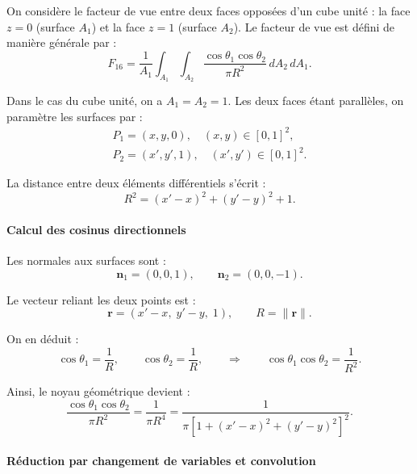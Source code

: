 On considère le facteur de vue entre deux faces opposées d'un cube unité : la face $z=0$ (surface $A_1$) et la face $z=1$ (surface $A_2$). Le facteur de vue est défini de manière générale par :
\begin{equation}
F_{16}=\frac{1}{A_1}\int_{A_1}\int_{A_2}\frac{\cos\theta_1 \cos\theta_2}{\pi R^2}\, dA_2\, dA_1.
\end{equation}

Dans le cas du cube unité, on a $A_1=A_2=1$. Les deux faces étant parallèles, on paramètre les surfaces par :
\begin{align}
P_1=(x,y,0), \quad (x,y)\in[0,1]^2,\\
P_2=(x',y',1), \quad (x',y')\in[0,1]^2.
\end{align}

La distance entre deux éléments différentiels s'écrit :
\begin{equation}
R^2=(x'-x)^2+(y'-y)^2+1.
\end{equation}

\paragraph{Calcul des cosinus directionnels}

Les normales aux surfaces sont :
\begin{equation}
\mathbf n_1=(0,0,1), \qquad \mathbf n_2=(0,0,-1).
\end{equation}

Le vecteur reliant les deux points est :
\begin{equation}
\mathbf r=(x'-x,\;y'-y,\;1), \qquad R=\|\mathbf r\|.
\end{equation}

On en déduit :
\begin{equation}
\cos\theta_1=\frac{1}{R}, \qquad \cos\theta_2=\frac{1}{R}, \qquad \Rightarrow \qquad \cos\theta_1\cos\theta_2=\frac{1}{R^2}.
\end{equation}

Ainsi, le noyau géométrique devient :
\begin{equation}
\frac{\cos\theta_1 \cos\theta_2}{\pi R^2}=\frac{1}{\pi R^4}=\frac{1}{\pi\left[1+(x'-x)^2+(y'-y)^2\right]^2}.
\end{equation}

\paragraph{Réduction par changement de variables et convolution}

